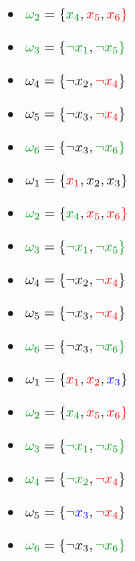 {\begin{minipage}[b]{\ratioc\linewidth}
\begin{itemize}
		\item[] $\cgreen{\omega_2} = \{\cgreen{x_4}, \cred{x_5}, \cred{x_6\}}$
		\item[] $\cgreen{\omega_3} = \{\cgreen{\neg x_1}, \cgreen{\neg x_5\}}$
		\item[] $\omega_4 = \{\neg x_2, {\color{red}\neg x_4}\}$
		\item[] $\omega_5 = \{\neg x_3, {\color{red}\neg x_4}\}$
		\item[] $\cgreen{\omega_6} = \{\neg x_3, \cgreen{\neg x_6\}}$
	\end{itemize}
\end{minipage}
\begin{minipage}[b]{\ratioc\linewidth}
	\begin{itemize}
		\item[] $\omega_1 = \{{\color{red}x_1}, x_2, x_3\}$ 
		\item[] $\cgreen{\omega_2} = \{\cgreen{x_4}, \cred{x_5}, \cred{x_6\}}$
		\item[] $\cgreen{\omega_3} = \{\cgreen{\neg x_1}, \cgreen{\neg x_5\}}$
		\item[] $\omega_4 = \{\neg x_2, {\color{red}\neg x_4}\}$
		\item[] $\omega_5 = \{\neg x_3, {\color{red}\neg x_4}\}$
		\item[] $\cgreen{\omega_6} = \{\neg x_3, \cgreen{\neg x_6\}}$
	\end{itemize}
\end{minipage}
\begin{minipage}[b]{\ratioc\linewidth}
	\begin{itemize}
		\item[] $\omega_1 = \{{\color{red}x_1}, {\color{red}x_2}, {\color{blue}x_3}\}$ 
		\item[] $\cgreen{\omega_2} = \{\cgreen{x_4}, \cred{x_5}, \cred{x_6\}}$
		\item[] $\cgreen{\omega_3} = \{\cgreen{\neg x_1}, \cgreen{\neg x_5\}}$
		\item[] $\cgreen{\omega_4} = \{\cgreen{\neg x_2}, \cred{\neg x_4}\}$
		\item[] $\omega_5 = \{{\color{blue}\neg x_3}, {\color{red}\neg x_4}\}$
		\item[] $\cgreen{\omega_6} = \{\neg x_3, \cgreen{\neg x_6\}}$

	\end{itemize}
\end{minipage}
}

